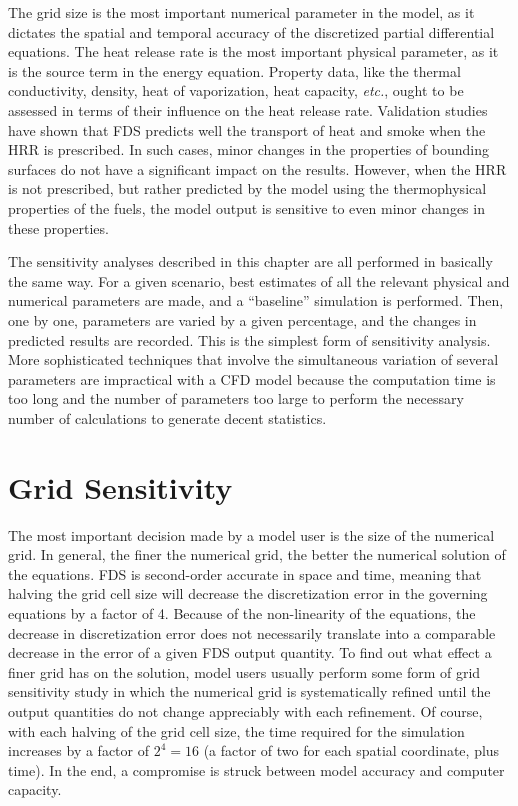 \documentclass[11pt]{book}
\begin{document}
The grid size is the  most important numerical parameter in the model,
as it  dictates the spatial  and temporal accuracy of  the discretized
partial  differential equations.  The heat  release rate  is  the most
important physical parameter,  as it is the source  term in the energy
equation. Property data, like  the thermal conductivity, density, heat
of vaporization,  heat capacity, {\em  etc.}, ought to be  assessed in
terms of their influence on  the heat release rate. Validation studies
have shown that FDS predicts well the transport of heat and smoke when
the HRR is prescribed. In  such cases, minor changes in the properties
of  bounding  surfaces  do  not  have  a  significant  impact  on  the
results. However, when the HRR is not prescribed, but rather predicted
by the  model using  the thermophysical properties  of the  fuels, the
model output is sensitive to even minor changes in these properties.

The sensitivity  analyses described in this chapter  are all performed
in basically the same way. For a given scenario, best estimates of all
the  relevant  physical  and  numerical  parameters are  made,  and  a
``baseline'' simulation is performed. Then, one by one, parameters are
varied by a given percentage, and the changes in predicted results are
recorded.  This is  the simplest  form of  sensitivity  analysis. More
sophisticated  techniques that involve  the simultaneous  variation of
several  parameters  are impractical  with  a  CFD  model because  the
computation time is too long and the number of parameters too large to
perform  the  necessary  number  of calculations  to  generate  decent
statistics.



\section{Grid Sensitivity}

\label{gridsen}

The most  important decision made by a  model user is the  size of the
numerical grid. In  general, the finer the numerical  grid, the better
the numerical solution of  the equations. FDS is second-order accurate
in  space and  time,  meaning that  halving  the grid  cell size  will
decrease  the discretization  error in  the governing  equations  by a
factor  of 4.  Because  of  the non-linearity  of  the equations,  the
decrease in discretization error does not necessarily translate into a
comparable decrease  in the error of  a given FDS  output quantity. To
find out  what effect a  finer grid has  on the solution,  model users
usually  perform some  form of  grid  sensitivity study  in which  the
numerical grid  is systematically refined until  the output quantities
do not change  appreciably with each refinement. Of  course, with each
halving of  the grid cell size,  the time required  for the simulation
increases by  a factor of $2^4=16$  (a factor of two  for each spatial
coordinate, plus  time). In  the end, a  compromise is  struck between
model accuracy and computer capacity.
\end{document}
